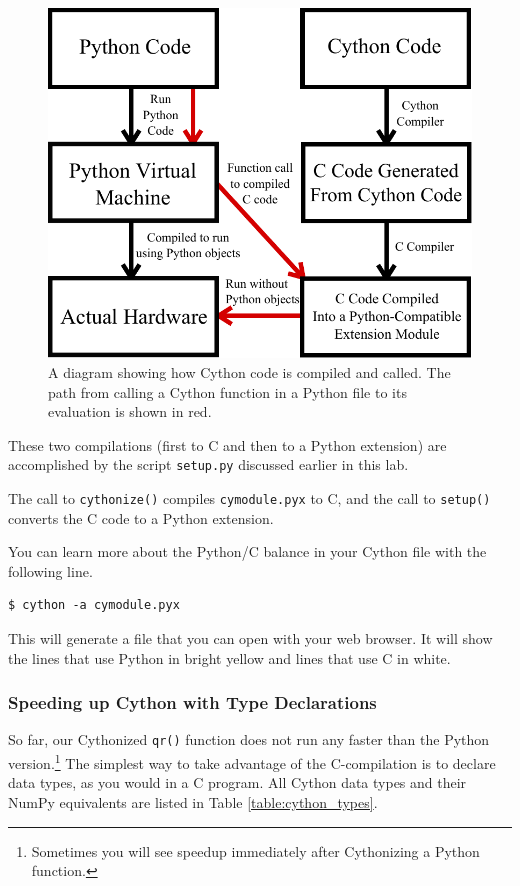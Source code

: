 \begin{figure}
\centering
\includegraphics[width=.7\textwidth]{compilation.pdf}
\caption{A diagram showing how Cython code is compiled and called.
The path from calling a Cython function in a Python file to its evaluation is shown in red.}
\label{cython:compilation}
\end{figure}

These two compilations (first to C and then to a Python extension) are accomplished by the script \texttt{setup.py} discussed earlier in this lab.

The call to \texttt{cythonize()} compiles \texttt{cymodule.pyx} to C, and the call to \texttt{setup()} converts the C code to a Python extension.

\begin{info}
You can learn more about the Python/C balance in your Cython file with the following line.
\begin{lstlisting}
$ cython -a cymodule.pyx
\end{lstlisting}
This will generate a  file that you can open with your web browser.
It will show the lines that use Python in bright yellow and lines that use C in white.
\end{info}

\subsubsection*{Speeding up Cython with Type Declarations}
So far, our Cythonized \texttt{qr()} function does not run any faster than the Python version.\footnote{Sometimes you will see speedup immediately after Cythonizing a Python function.}
The simplest way to take advantage of the C-compilation is to declare data types, as you would in a C program.
All Cython data types and their NumPy equivalents are listed in Table \ref{table:cython_types}.

